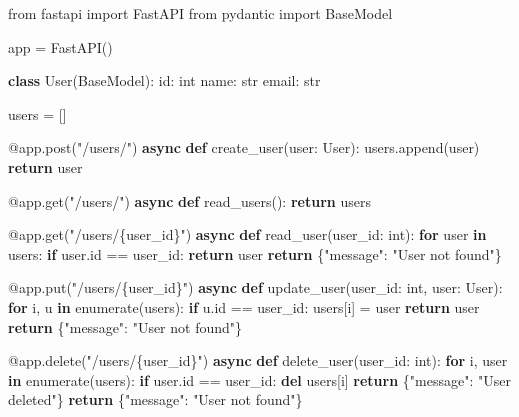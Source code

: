 \documentclass[
  a4paper,
  DIV=11,
  numbers=noendperiod,
  onepage,
  openany]{scrreprt}
\newenvironment{Shaded}{\begin{snugshade}}{\end{snugshade}}
\newcommand{\AttributeTok}[1]{\textcolor[rgb]{0.40,0.45,0.13}{#1}}
\newcommand{\BuiltInTok}[1]{\textcolor[rgb]{0.00,0.23,0.31}{#1}}
\newcommand{\ControlFlowTok}[1]{\textcolor[rgb]{0.00,0.23,0.31}{\textbf{#1}}}
\newcommand{\ImportTok}[1]{\textcolor[rgb]{0.00,0.46,0.62}{#1}}
\newcommand{\KeywordTok}[1]{\textcolor[rgb]{0.00,0.23,0.31}{\textbf{#1}}}
\newcommand{\NormalTok}[1]{\textcolor[rgb]{0.00,0.23,0.31}{#1}}
\newcommand{\OperatorTok}[1]{\textcolor[rgb]{0.37,0.37,0.37}{#1}}
\newcommand{\SpecialCharTok}[1]{\textcolor[rgb]{0.37,0.37,0.37}{#1}}
\newcommand{\StringTok}[1]{\textcolor[rgb]{0.13,0.47,0.30}{#1}}
\begin{document}
\begin{Shaded}
\begin{Highlighting}[]
\ImportTok{from}\NormalTok{ fastapi }\ImportTok{import}\NormalTok{ FastAPI}
\ImportTok{from}\NormalTok{ pydantic }\ImportTok{import}\NormalTok{ BaseModel}

\NormalTok{app }\OperatorTok{=}\NormalTok{ FastAPI()}

\KeywordTok{class}\NormalTok{ User(BaseModel):}
    \BuiltInTok{id}\NormalTok{: }\BuiltInTok{int}
\NormalTok{    name: }\BuiltInTok{str}
\NormalTok{    email: }\BuiltInTok{str}

\NormalTok{users }\OperatorTok{=}\NormalTok{ []}

\AttributeTok{@app.post}\NormalTok{(}\StringTok{"/users/"}\NormalTok{)}
\ControlFlowTok{async} \KeywordTok{def}\NormalTok{ create\_user(user: User):}
\NormalTok{    users.append(user)}
    \ControlFlowTok{return}\NormalTok{ user}

\AttributeTok{@app.get}\NormalTok{(}\StringTok{"/users/"}\NormalTok{)}
\ControlFlowTok{async} \KeywordTok{def}\NormalTok{ read\_users():}
    \ControlFlowTok{return}\NormalTok{ users}

\AttributeTok{@app.get}\NormalTok{(}\StringTok{"/users/}\SpecialCharTok{\{user\_id\}}\StringTok{"}\NormalTok{)}
\ControlFlowTok{async} \KeywordTok{def}\NormalTok{ read\_user(user\_id: }\BuiltInTok{int}\NormalTok{):}
    \ControlFlowTok{for}\NormalTok{ user }\KeywordTok{in}\NormalTok{ users:}
        \ControlFlowTok{if}\NormalTok{ user.}\BuiltInTok{id} \OperatorTok{==}\NormalTok{ user\_id:}
            \ControlFlowTok{return}\NormalTok{ user}
    \ControlFlowTok{return}\NormalTok{ \{}\StringTok{"message"}\NormalTok{: }\StringTok{"User not found"}\NormalTok{\}}

\AttributeTok{@app.put}\NormalTok{(}\StringTok{"/users/}\SpecialCharTok{\{user\_id\}}\StringTok{"}\NormalTok{)}
\ControlFlowTok{async} \KeywordTok{def}\NormalTok{ update\_user(user\_id: }\BuiltInTok{int}\NormalTok{, user: User):}
    \ControlFlowTok{for}\NormalTok{ i, u }\KeywordTok{in} \BuiltInTok{enumerate}\NormalTok{(users):}
        \ControlFlowTok{if}\NormalTok{ u.}\BuiltInTok{id} \OperatorTok{==}\NormalTok{ user\_id:}
\NormalTok{            users[i] }\OperatorTok{=}\NormalTok{ user}
            \ControlFlowTok{return}\NormalTok{ user}
    \ControlFlowTok{return}\NormalTok{ \{}\StringTok{"message"}\NormalTok{: }\StringTok{"User not found"}\NormalTok{\}}

\AttributeTok{@app.delete}\NormalTok{(}\StringTok{"/users/}\SpecialCharTok{\{user\_id\}}\StringTok{"}\NormalTok{)}
\ControlFlowTok{async} \KeywordTok{def}\NormalTok{ delete\_user(user\_id: }\BuiltInTok{int}\NormalTok{):}
    \ControlFlowTok{for}\NormalTok{ i, user }\KeywordTok{in} \BuiltInTok{enumerate}\NormalTok{(users):}
        \ControlFlowTok{if}\NormalTok{ user.}\BuiltInTok{id} \OperatorTok{==}\NormalTok{ user\_id:}
            \KeywordTok{del}\NormalTok{ users[i]}
            \ControlFlowTok{return}\NormalTok{ \{}\StringTok{"message"}\NormalTok{: }\StringTok{"User deleted"}\NormalTok{\}}
    \ControlFlowTok{return}\NormalTok{ \{}\StringTok{"message"}\NormalTok{: }\StringTok{"User not found"}\NormalTok{\}}


\end{Highlighting}
\end{Shaded}
\end{document}
